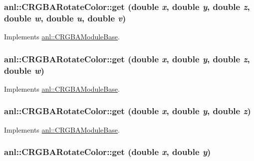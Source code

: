 \label{classanl_1_1CRGBARotateColor_a198971009099113094d7da3fa774adf6}
\hypertarget{classanl_1_1CRGBARotateColor_a2a41a9e088707832997a0a515bf87e19}{
\subsubsection[{get}]{ anl::CRGBARotateColor::get (double {\em x}, \/  double {\em y}, \/  double {\em z}, \/  double {\em w}, \/  double {\em u}, \/  double {\em v})}}
\label{classanl_1_1CRGBARotateColor_a2a41a9e088707832997a0a515bf87e19}


Implements \hyperlink{classanl_1_1CRGBAModuleBase_aa5a0b719101302596a697aa8c2292f55}{anl::CRGBAModuleBase}.\hypertarget{classanl_1_1CRGBARotateColor_a543b68b45b188b430f57fe645ac3e3c6}{
\subsubsection[{get}]{ anl::CRGBARotateColor::get (double {\em x}, \/  double {\em y}, \/  double {\em z}, \/  double {\em w})}}
\label{classanl_1_1CRGBARotateColor_a543b68b45b188b430f57fe645ac3e3c6}


Implements \hyperlink{classanl_1_1CRGBAModuleBase_ab94523074ef298bb99f0830051e78c1c}{anl::CRGBAModuleBase}.\hypertarget{classanl_1_1CRGBARotateColor_a8dbecf4dacad0814addb213cbd83b6cc}{
\subsubsection[{get}]{ anl::CRGBARotateColor::get (double {\em x}, \/  double {\em y}, \/  double {\em z})}}
\label{classanl_1_1CRGBARotateColor_a8dbecf4dacad0814addb213cbd83b6cc}


Implements \hyperlink{classanl_1_1CRGBAModuleBase_a097897c2d625c824832325260169c90e}{anl::CRGBAModuleBase}.\hypertarget{classanl_1_1CRGBARotateColor_a14d2e43da4ad85d88b6bfce5e5cafcae}{
\subsubsection[{get}]{ anl::CRGBARotateColor::get (double {\em x}, \/  double {\em y})}}
\label{classanl_1_1CRGBARotateColor_a14d2e43da4ad85d88b6bfce5e5cafcae}


